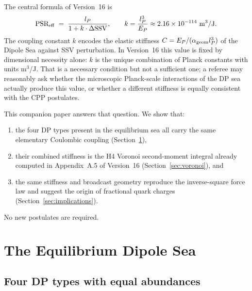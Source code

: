 \documentclass[12pt]{article}
\newcommand{\lP}{l_P}
\newcommand{\EP}{E_P}
\newcommand{\SSV}{\text{SSV}}
\newcommand{\PSR}{\text{PSR}}
\newcommand{\alphageom}{\alpha_{\rm geom}}
\begin{document}
The central formula of Version~16 is
\begin{equation}
  \PSR_{\rm eff} \;=\; \frac{\lP}{1 + k\cdot\Delta\SSV},
  \qquad k = \frac{\lP^3}{\EP} \approx 2.16\times10^{-114}\ \text{m}^3/\text{J}.
  \label{eq:PSR}
\end{equation}
The coupling constant $k$ encodes the elastic stiffness $C = \EP/(\alphageom\lP^3)$
of the Dipole Sea against SSV perturbation.  In Version~16 this value is
fixed by dimensional necessity alone: $k$ is the unique combination of Planck
constants with units m$^3$/J.  That is a necessary condition but not a
sufficient one; a referee may reasonably ask whether the microscopic
Planck-scale interactions of the DP sea actually produce this value, or whether
a different stiffness is equally consistent with the CPP postulates.

This companion paper answers that question.  We show that:
\begin{enumerate}
  \item the four DP types present in the equilibrium sea all carry the same
    elementary Coulombic coupling (Section~\ref{sec:dp-sea}),
  \item their combined stiffness is the H4 Voronoi second-moment integral
    already computed in Appendix~A.5 of Version~16
    (Section~\ref{sec:voronoi}), and
  \item the same stiffness and broadcast geometry reproduce the inverse-square
    force law and suggest the origin of fractional quark charges
    (Section~\ref{sec:implications}).
\end{enumerate}
No new postulates are required.

\section{The Equilibrium Dipole Sea}
\label{sec:dp-sea}

\subsection{Four DP types with equal abundances}
\end{document}

